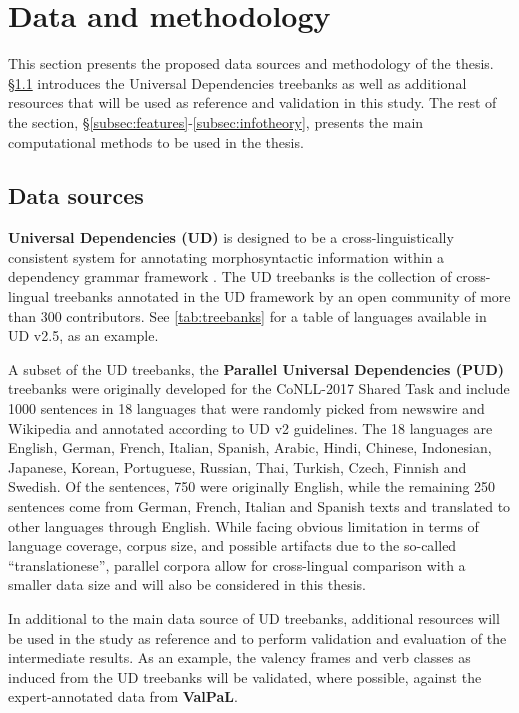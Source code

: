\section{Data and methodology}\label{sec:methodology}

This section presents the proposed data sources and methodology of the thesis. \S\ref{subsec:data-sources} introduces the Universal Dependencies treebanks as well as additional resources that will be used as reference and validation in this study. The rest of the section, \S\ref{subsec:features}-\ref{subsec:infotheory}, presents the main computational methods to be used in the thesis.

\subsection{Data sources}\label{subsec:data-sources}

\textbf{Universal Dependencies (UD)} is designed to be a cross-linguistically consistent system for annotating morphosyntactic information within a dependency grammar framework \citep{demarneffe2021}. The UD treebanks \citep{universaldep} is the collection of cross-lingual treebanks annotated in the UD framework by an open community of more than 300 contributors. See \ref{tab:treebanks} for a table of languages available in UD v2.5, as an example.



A subset of the UD treebanks, the \textbf{Parallel Universal Dependencies (PUD)} treebanks were originally developed for the CoNLL-2017 Shared Task \citep{zeman2017} and include 1000 sentences in 18 languages that were randomly picked from newswire and Wikipedia and annotated according to UD v2 guidelines. The 18 languages are English, German, French, Italian, Spanish, Arabic, Hindi, Chinese, Indonesian, Japanese, Korean, Portuguese, Russian, Thai, Turkish, Czech, Finnish and Swedish. Of the sentences, 750 were originally English, while the remaining 250 sentences come from German, French, Italian and Spanish texts and translated to other languages through English. While facing obvious limitation in terms of language coverage, corpus size, and possible artifacts due to the so-called ``translationese'', parallel corpora allow for cross-lingual comparison with a smaller data size and will also be considered in this thesis.

In additional to the main data source of UD treebanks, additional resources will be used in the study as reference and to perform validation and evaluation of the intermediate results. As an example, the valency frames and verb classes as induced from the UD treebanks will be validated, where possible, against the expert-annotated data from \textbf{ValPaL}\citep{valpal}. 

